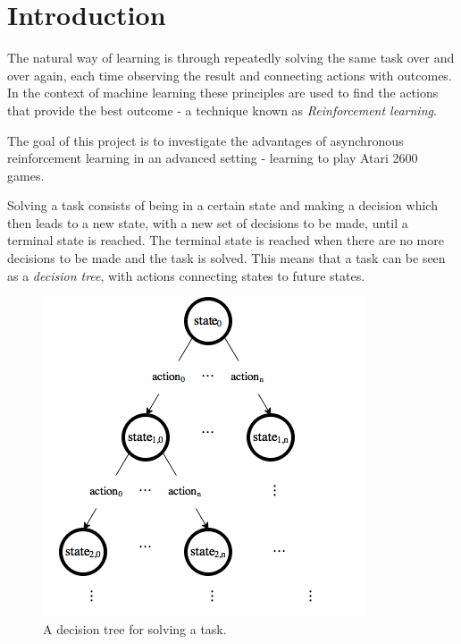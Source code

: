 \documentclass[11pt]{article}
\begin{document}
\maketitle

\section{Introduction}

The natural way of learning is through repeatedly solving the same
task over and over again, each time observing the result and connecting
actions with outcomes.
In the context of machine learning these principles are used
to find the actions that provide the best outcome - a technique known as
\textit{Reinforcement learning}.

The goal of this project is to investigate the advantages of asynchronous reinforcement
learning in an advanced setting - learning to play Atari 2600 games\cite{openAIEnvs}.

Solving a task consists of being in a certain state and making a decision 
which then leads
to a new state, with a new set of decisions to be made, until
a terminal state is reached.
The terminal state is reached when there are no more decisions to be made
and the task is solved.
This means that a task can be seen as a \textit{decision tree}, with actions connecting states to future states.
\begin{figure}[H]
    \centering
    \includegraphics[scale=0.5]{include/decision_tree.png}
    \caption{A decision tree for solving a task.}
    \label{fig:dec_tree}
\end{figure}
\end{document}
